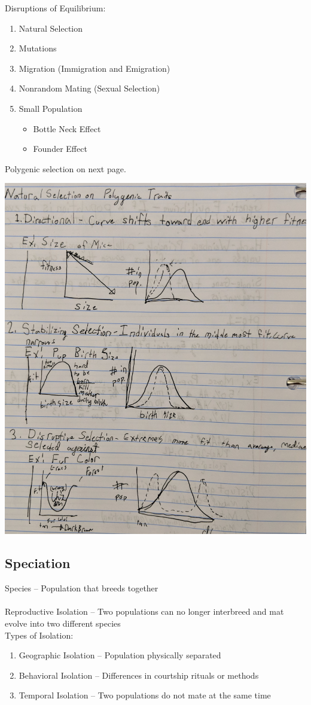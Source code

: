 \documentclass{article}
\begin{document}
Disruptions of Equilibrium:\\
\begin{enumerate}
\item Natural Selection
\item Mutations
\item Migration (Immigration and Emigration)
\item Nonrandom Mating (Sexual Selection)
\item Small Population
\begin{itemize}
\item Bottle Neck Effect
\item Founder Effect
\end{itemize}
\end{enumerate}
Polygenic selection on next page.

\includegraphics[scale=0.2]{multigenegraphs}
\subsection{Speciation}
Species -- Population that breeds together\\
\\
Reproductive Isolation -- Two populations can no longer interbreed and mat evolve into two different species\\
Types of Isolation:
\begin{enumerate}
\item Geographic Isolation -- Population physically separated
\item Behavioral Isolation -- Differences in courtship rituals or methods
\item Temporal Isolation -- Two populations do not mate at the same time
\end{enumerate}
\end{document}

